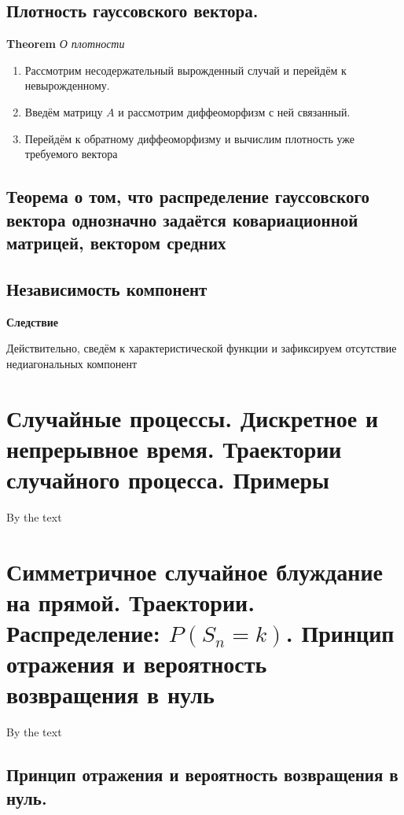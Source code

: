 \documentclass[a4paper, 14pt]{article}
\begin{document}
    \subsection{Плотность гауссовского вектора.}
    
    \textbf{Theorem} \textit{О плотности}
    
    \begin{enumerate}
        \item Рассмотрим несодержательный вырожденный случай и перейдём к невырожденному.
        \item Введём матрицу $A$ и рассмотрим диффеоморфизм с ней связанный.
        \item Перейдём к обратному диффеоморфизму и вычислим плотность уже требуемого вектора
    \end{enumerate}
    
    \subsection{Теорема о том, что распределение гауссовского вектора однозначно задаётся ковариационной матрицей,
        вектором средних}
    
    \subsection{Независимость компонент}
    
    \textbf{Следствие}
    
    Действительно, сведём к характеристической функции и зафиксируем отсутствие недиагональных компонент
    
    \section{Случайные процессы.
    Дискретное и непрерывное время.
    Траектории случайного процесса.
    Примеры}
    
    By the text
    
    \section{Симметричное случайное блуждание на прямой.
    Траектории.
    Распределение: $P(S_n = k)$.
    Принцип отражения и вероятность возвращения в нуль}
    
    By the text
    
    \subsection{Принцип отражения и вероятность возвращения в нуль.}
    
\end{document}

